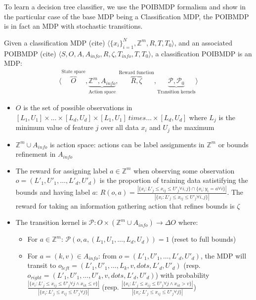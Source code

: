 To learn a decision tree classifier, we use the POIBMDP formalism and show in the particular case of the base MDP being a Classification MDP, the POIBMDP is in fact an MDP with stochastic transitions. 

\begin{definition}
    Given a classification MDP (cite) $\langle {\{x_i\}}_{i=1}^N, \mathbb{Z}^m, R, T, T_0 \rangle$, and an associated POIBMDP (cite) $\langle S, O, A, A_{info}, R, \zeta, T_{info}, T, T_0\rangle$, a classification POIBMDP is an MDP:
    \begin{align*}
        \langle \overbrace{O}^{\text{State space}}, \underbrace{\mathbb{Z}^m, A_{info}}_{\text{Action space}}, \overbrace{R, \zeta}^{\text{Reward function}}, \underbrace{\mathcal{P}, \mathcal{P}_0}_{\text{Transition kernels}} \rangle
    \end{align*}
    \begin{itemize}
        \item $O$ is the set of possible observations in $[L_1, U_1] \times \dots \times [L_d, U_d] \times [L_1, U_1] \ times \dots \times [L_d, U_d] $ where $L_j$ is the minimum value of feature $j$ over all data $x_i$ and $U_j$ the maximum
        \item $\mathbb{Z}^m \cup A_{info}$ is action space: actions can be label assignments in $\mathbb{Z}^m$ or bounds refinement in $A_{info}$
        \item The reward for assigning label $a\in \mathbb{Z}^m$ when observing some observation $o=(L'_1, U'_1, \dots, L'_d, U'_d)$ is the proportion of training data satistifying the bounds and having label $a$: $R(o, a) = \frac{|\{x_i: L'_j \leq x_{ij} \leq U'_j \forall i,j \} \cap \{x_i: y_i = a \forall i \}|}{|\{x_i: L'_j \leq x_{ij} \leq U'_j \forall i,j \}|}$. 
        The reward for taking an information gathering action that refines bounds is $\zeta$
        \item The transition kernel is $\mathcal{P}:O \times (\mathbb{Z}^m \cup A_{info}) \rightarrow \Delta O$ where:
        \begin{itemize}
            \item For $a \in \mathbb{Z}^m$: $\mathcal{P}(o, a, (L_1, U_1, \dots, L_d, U_d)) = 1$ (reset to full bounds)
            \item For $a = (k, v) \in A_{info}$: from $o=(L'_1, U'_1, \dots, L'_d, U'_d)$, the MDP will transit to $o_{left} = (L'_1, U'_1, \dots, L_k, v, dots, L'_d, U'_d)$ (resp. $o_{right} = (L'_1, U'_1, \dots, U'_k, v, dots, L'_d, U'_d)$) with probability $\frac{|\{x_i: L'_j \leq x_{ij} \leq U'_j \forall j \land x_{ik} \leq v\}|}{|\{x_i: L'_j \leq x_{ij} \leq U'_j \forall j\}|}$ (resp. $\frac{|\{x_i: L'_j \leq x_{ij} \leq U'_j \forall j \land x_{ik} > v\}|}{|\{x_i: L'_j \leq x_{ij} \leq U'_j \forall j\}|}$)
        \end{itemize}
    \end{itemize}
\end{definition}

